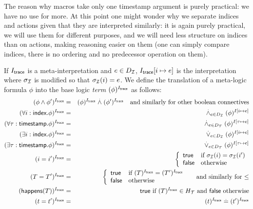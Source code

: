 The reason why macros take only one timestamp argument is purely practical:
we have no use for more. At this point one might wonder why we separate
indices and actions given that they are interpreted similarly: it is again
purely practical, we will use them for different purposes, and we will need
less structure on indices than on actions, making reasoning easier on them
(one can simply compare indices, there is no ordering and no predecessor
operation on them).


\begin{definition}
  If $I_{\textsf{trace}}$ is a meta-interpretation and $e\in D_{\mathcal{I}}$,
  $I_{\textsf{trace}}[i\mapsto e]$ is the interpretation where $\sigma_{\mathcal{I}}$ is
  modified so that $\sigma_{\mathcal{I}}(i)=e$.
  We define the translation of a meta-logic formula $\phi$
  into the base logic \emph{term} $(\phi)^{I_{\textsf{trace}}}$
  as follows:
  \begin{eqnarray*}
    (\phi\wedge\phi')^{I_{\textsf{trace}}} &=& (\phi)^{I_{\textsf{trace}}} \stackrel{.}{\wedge} (\phi')^{I_{\textsf{trace}}}
    \quad \text{and similarly for other boolean connectives} \\
    (\forall i:\textsf{index}. \phi)^{I_{\textsf{trace}}} &=&
    \stackrel{.}{\wedge}_{e\in D_{\mathcal{I}}} (\phi)^{I[i\mapsto e]} \\
    (\forall \tau:\textsf{timestamp}. \phi)^{I_{\textsf{trace}}} &=&
    \stackrel{.}{\wedge}_{e\in D_{\mathcal{T}}} (\phi)^{I[\tau\mapsto e]} \\
    (\exists i:\textsf{index}. \phi)^{I_{\textsf{trace}}} &=&
    \stackrel{.}{\vee}_{e\in D_{\mathcal{I}}} (\phi)^{I[i\mapsto e]} \\
    (\exists \tau:\textsf{timestamp}. \phi)^{I_{\textsf{trace}}} &=&
    \stackrel{.}{\vee}_{e\in D_{\mathcal{T}}} (\phi)^{I[\tau\mapsto e]} \\
    (i=i')^{I_{\textsf{trace}}} &=&
    \left\{\begin{array}{ll}
      \mathsf{true} & \text{if } \sigma_{\mathcal{I}}(i)=\sigma_{\mathcal{I}}(i') \\
      \mathsf{false} & \text{otherwise}
    \end{array}\right. \\
    (T = T')^{I_{\textsf{trace}}} &=&
    \left\{\begin{array}{ll}
      \mathsf{true} & \text{if } (T)^{I_{\textsf{trace}}} = (T')^{I_{\textsf{trace}}} \\
      \mathsf{false} & \text{otherwise}
    \end{array}\right.
    \quad\text{ and similarly for $\leq$} \\
    (\textsf{happens}(T))^{I_{\textsf{trace}}} &=& \mathsf{true}
    \text{ if } (T)^{I_{\textsf{trace}}} \in H_{\mathcal{T}}
    \text{ and } \mathsf{false} \text{ otherwise}
    \\
    (t=t')^{I_{\textsf{trace}}} &=& (t)^{I_{\textsf{trace}}} \stackrel{.}{=} (t')^{I_{\textsf{trace}}}
  \end{eqnarray*}
\end{definition}

